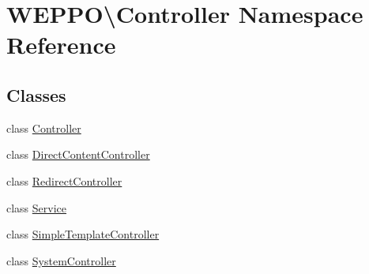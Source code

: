 \hypertarget{namespaceWEPPO_1_1Controller}{}\section{W\+E\+P\+PO\textbackslash{}Controller Namespace Reference}
\label{namespaceWEPPO_1_1Controller}
\subsection*{Classes}
\begin{DoxyCompactItemize}
\item 
class \hyperlink{classWEPPO_1_1Controller_1_1Controller}{Controller}
\item 
class \hyperlink{classWEPPO_1_1Controller_1_1DirectContentController}{Direct\+Content\+Controller}
\item 
class \hyperlink{classWEPPO_1_1Controller_1_1RedirectController}{Redirect\+Controller}
\item 
class \hyperlink{classWEPPO_1_1Controller_1_1Service}{Service}
\item 
class \hyperlink{classWEPPO_1_1Controller_1_1SimpleTemplateController}{Simple\+Template\+Controller}
\item 
class \hyperlink{classWEPPO_1_1Controller_1_1SystemController}{System\+Controller}
\end{DoxyCompactItemize}
